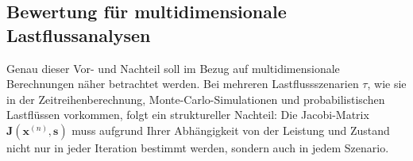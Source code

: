 
\subsection{Bewertung für multidimensionale Lastflussanalysen}
\label{subsec:nr_massen}

Genau dieser Vor- und Nachteil soll im Bezug auf multidimensionale Berechnungen näher betrachtet werden.
Bei mehreren Lastflussszenarien $\tau$, wie sie in der Zeitreihenberechnung, Monte-Carlo-Simulationen und probabilistischen Lastflüssen vorkommen, folgt ein struktureller Nachteil: Die Jacobi-Matrix $\mathbf{J}(\mathbf{x}^{(n)}, \mathbf{s})$ muss aufgrund Ihrer Abhängigkeit von der Leistung und Zustand nicht nur in jeder Iteration bestimmt werden, sondern auch in jedem Szenario.\\
%
%

